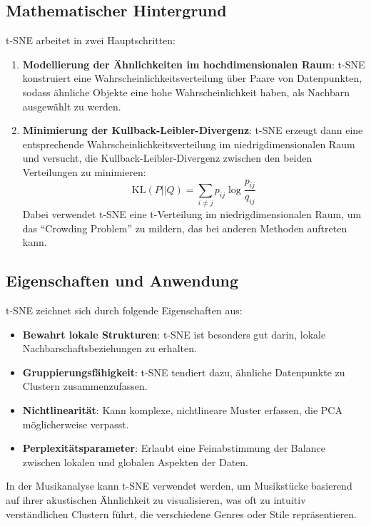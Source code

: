 \subsection{Mathematischer Hintergrund}

t-SNE arbeitet in zwei Hauptschritten:

\begin{enumerate}
    \item \textbf{Modellierung der Ähnlichkeiten im hochdimensionalen Raum}: t-SNE konstruiert eine Wahrscheinlichkeitsverteilung über Paare von Datenpunkten, sodass ähnliche Objekte eine hohe Wahrscheinlichkeit haben, als Nachbarn ausgewählt zu werden.
    \item \textbf{Minimierung der Kullback-Leibler-Divergenz}: t-SNE erzeugt dann eine entsprechende Wahrscheinlichkeitsverteilung im niedrigdimensionalen Raum und versucht, die Kullback-Leibler-Divergenz zwischen den beiden Verteilungen zu minimieren:
    \[
    \text{KL}(P || Q) = \sum_{i \neq j} p_{ij} \log \frac{p_{ij}}{q_{ij}}
    \]
    Dabei verwendet t-SNE eine t-Verteilung im niedrigdimensionalen Raum, um das ``Crowding Problem'' zu mildern, das bei anderen Methoden auftreten kann.
\end{enumerate}\cite{vanDerMaaten2008}

\subsection{Eigenschaften und Anwendung}

t-SNE zeichnet sich durch folgende Eigenschaften aus:

\begin{itemize}
    \item \textbf{Bewahrt lokale Strukturen}: t-SNE ist besonders gut darin, lokale Nachbarschaftsbeziehungen zu erhalten.
    \item \textbf{Gruppierungsfähigkeit}: t-SNE tendiert dazu, ähnliche Datenpunkte zu Clustern zusammenzufassen.
    \item \textbf{Nichtlinearität}: Kann komplexe, nichtlineare Muster erfassen, die PCA möglicherweise verpasst.
    \item \textbf{Perplexitätsparameter}: Erlaubt eine Feinabstimmung der Balance zwischen lokalen und globalen Aspekten der Daten.
\end{itemize}

In der Musikanalyse kann t-SNE verwendet werden, um Musikstücke basierend auf ihrer akustischen Ähnlichkeit zu visualisieren, was oft zu intuitiv verständlichen Clustern führt, die verschiedene Genres oder Stile repräsentieren.\cite{tsnescikit, efficienttsne}

